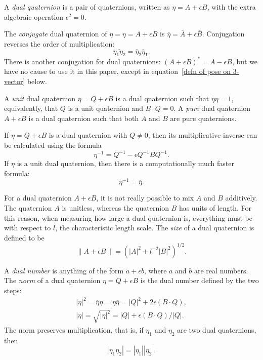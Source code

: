 \documentclass[reqno,12pt]{amsart}
\begin{document}
A \emph{dual quaternion} is a pair of quaternions, written as $\eta = A + \epsilon B$, with the extra algebraic operation $\epsilon^2 = 0$.

The \emph{conjugate} dual quaternion of $\eta = \eta = A + \epsilon B$ is $\overline\eta = \overline A + \epsilon \overline B$.  Conjugation reverses the order of multiplication:
\begin{equation}
\overline{\eta_1\eta_2} = \overline \eta_2 \overline \eta_1 .
\end{equation}
There is another conjugation for dual quaternions: $(A + \epsilon B)^* = A - \epsilon B$, but we have no cause to use it in this paper, except in equation~\eqref{defn of pose on 3-vector} below.

A \emph{unit} dual quaternion $\eta = Q + \epsilon B$ is a dual quaternion such that $\overline\eta\eta = 1$, equivalently, that $Q$ is a unit quaternion and $B \cdot Q = 0$.  A \emph{pure} dual quaternion $A + \epsilon B$ is a dual quaternion such that both $A$ and $B$ are pure quaternions.

If $\eta = Q + \epsilon B$ is a dual quaternion with $Q \ne 0$, then its multiplicative inverse can be calculated using the formula
\begin{equation}
\eta^{-1} = Q^{-1} - \epsilon Q^{-1} B Q^{-1}.
\end{equation}
If $\eta$ is a unit dual quaternion, then there is a computationally much faster formula:
\begin{equation}
\label{inverse unit}
\eta^{-1} = \overline \eta.
\end{equation}

For a dual quaternion $A + \epsilon B$, it is not really possible to mix $A$ and $B$ additively.  The quaternion $A$ is unitless, whereas the quaternion $B$ has units of length.  For this reason, when measuring how large a dual quaternion is, everything must be with respect to $l$, the characteristic length scale.  The \emph{size} of a dual quaternion is defined to be
\begin{equation}
\label{size}
\|A+\epsilon B\| = \left(|A|^2 + l^{-2}|B|^2\right)^{1/2}.
\end{equation}

A \emph{dual number} is anything of the form $a + \epsilon b$, where $a$ and $b$ are real numbers.  The \emph{norm} of a dual quaternion $\eta = Q + \epsilon B$ is the dual number defined by the two steps:
\begin{gather}
|\eta|^2 = \overline{\eta} \eta = \eta \overline\eta = |Q|^2 + 2 \epsilon (B \cdot Q) ,\\
\label{norm}
|\eta| = \sqrt{|\eta|^2} = |Q| + \epsilon (B \cdot Q) / |Q| .
\end{gather}
The norm preserves multiplication, that is, if $\eta_1$ and $\eta_2$ are two dual quaternions, then
\begin{equation}
\label{norm mult}
|\eta_1 \eta_2| = |\eta_1| |\eta_2| .
\end{equation}
\end{document}

